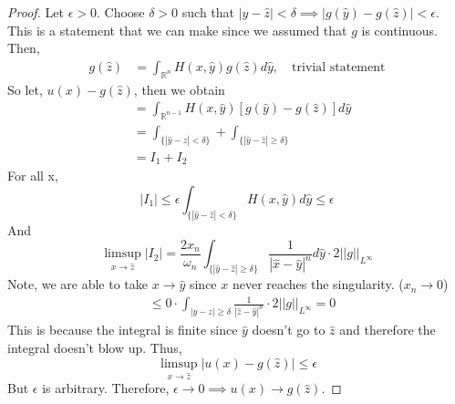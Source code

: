 \documentclass{article}
\newtheorem{one minute paper}[theorem]{One Minute Paper}
\begin{document}
\begin{proof}
    Let $\epsilon > 0$. Choose $\delta >0$ such that $|\hat{y} - \hat{z}| < \delta \implies |g(\hat{y}) - g(\hat{z})| < \epsilon$. This is a statement that we can make since we assumed that $g$ is continuous. Then, 
    \begin{align*}
        g(\hat{z}) &= \int_{\mathbb{R}^n}H(x,\hat{y})g(\hat{z})d\hat{y}, \quad \text{trivial statement}
    \end{align*} 
    So let, $u(x) - g(\hat{z})$, then we obtain 
    \begin{align*}
        &= \int_{\mathbb{R}^{n-1}}H(x,\hat{y})[g(\hat{y}) - g(\hat{z})]d\hat{y} \\
        &= \int_{\{|\hat{y} - \hat{z}| < \delta\}} + \int_{\{|\hat{y} - \hat{z}| \geq \delta\}}\\
        &= I_1 + I_2
    \end{align*}
    For all x, 
    \begin{equation}
        |I_1| \leq \epsilon\int_{\{|\hat{y} - \hat{z}| < \delta\}}H(x,\hat{y})d\hat{y} \leq \epsilon
    \end{equation}
    And 
    \begin{equation}
        \limsup_{x \rightarrow \hat{z}}|I_2| = \frac{2x_n}{\omega_n} \int_{\{|\hat{y} - \hat{z}| \geq \delta\}} \frac{1}{|\hat{x} - \hat{y}|^n}d\hat{y} \cdot 2 ||g||_{L^{\infty}}
    \end{equation}
    Note, we are able to take $x \rightarrow \hat{y}$ since $x$ never reaches the singularity. ($x_n \rightarrow 0$)
    \begin{align*}
        &\leq 0 \cdot \int_{|y - z| \geq \delta} \frac{1}{|\hat{z}- \hat{y}|^n} \cdot 2 ||g||_{L^{\infty}} = 0
    \end{align*}
    This is because the integral is finite since $\hat{y}$ doesn't go to $\hat{z}$ and therefore the integral doesn't blow up. Thus, 
    \begin{equation}
        \limsup_{x \rightarrow \hat{z}} |u(x) - g(\hat{z})| \leq \epsilon
    \end{equation}
    But $\epsilon$ is arbitrary. Therefore, $\epsilon \rightarrow 0 \implies u(x) \rightarrow g(\hat{z})$. 
\end{proof}
\end{document}

